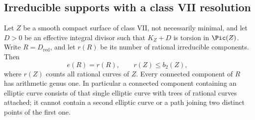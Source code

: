 \subsection{Irreducible supports with a class VII resolution}

\begin{lemma}
\label{st:C.2.VII.1}
Let $Z$ be a smooth compact surface of class VII, not
necessarily minimal, and let $D>0$ be an effective integral
divisor such that $K_Z+D$ is torsion in $\Pic(Z)$.
Write $R=D_{\mathrm{red}}$, and let $r(R)$ be its number
of rational irreducible components. Then
\[
 e(R)=r(R),\qquad r(Z)\le b_2(Z),
\tag{C.VII.1}
\]
where $r(Z)$ counts all rational curves of $Z$.
Every connected component of $R$ has arithmetic genus one.
In particular a connected component containing an elliptic
curve consists of that single elliptic curve with trees of
rational curves attached; it cannot contain a second
elliptic curve or a path joining two distinct points of the
first one.
\end{lemma}
